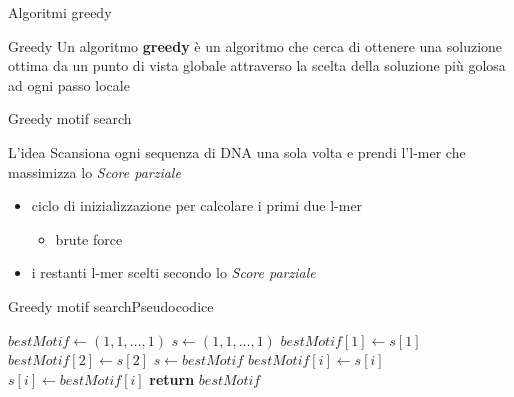 	\begin{frame}{Algoritmi greedy}
		\begin{block}{Greedy}
			Un algoritmo \alert{\textbf{greedy}} è un algoritmo che cerca di ottenere una soluzione ottima da un punto di vista globale attraverso la scelta della soluzione più golosa ad ogni passo locale
		\end{block}
	\end{frame}
	
	\begin{frame}{Greedy motif search}
		\begin{block}{L'idea}
			Scansiona ogni sequenza di DNA una sola volta e prendi l'l-mer che massimizza lo \textit{Score parziale}
		\end{block}
		\pause
		\begin{itemize}
			\item ciclo di inizializzazione per calcolare i primi due l-mer
			\begin{itemize}
				\item brute force
			\end{itemize}
			\pause
			\item i restanti l-mer scelti secondo lo \textit{Score parziale}
		\end{itemize}
	\end{frame}
	
	\begin{frame}{Greedy motif search}{Pseudocodice}
		\begin{center}\scriptsize
			\begin{minipage}{8.6cm}
			    \begin{algorithmic}[1]
				    	\State $bestMotif\gets (1,1,\dots,1)$
					    \State $s\gets (1,1,\dots,1)$
					    			\State $bestMotif[1]\gets s[1]$
					    			\State $bestMotif[2]\gets s[2]$
					    		\EndIf
					    	\EndFor
					    \EndFor
					    \State $s\gets bestMotif$
					    			\State $bestMotif[i]\gets s[i]$
					    		\EndIf
					    	\EndFor
					    	\State $s[i]\gets bestMotif[i]$
					    \EndFor
					    \State \textbf{return} $bestMotif$
				    \EndProcedure
			    \end{algorithmic}
			\end{minipage}
	    \end{center}
	\end{frame}
	
